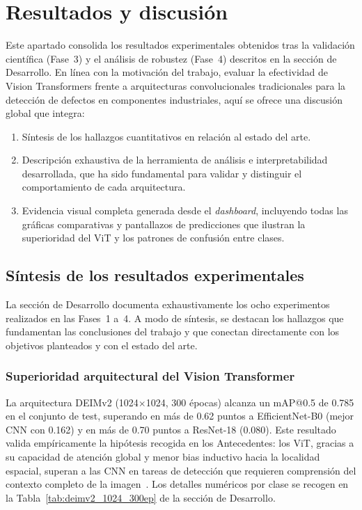\chapter{Resultados y discusión}
\label{ch:resultados}

Este apartado consolida los resultados experimentales obtenidos tras la validación científica (Fase~3) y el análisis de robustez (Fase~4) descritos en la sección de Desarrollo. En línea con la motivación del trabajo, evaluar la efectividad de Vision Transformers frente a arquitecturas convolucionales tradicionales para la detección de defectos en componentes industriales, aquí se ofrece una discusión global que integra:
\begin{enumerate}
    \item Síntesis de los hallazgos cuantitativos en relación al estado del arte.
    \item Descripción exhaustiva de la herramienta de análisis e interpretabilidad desarrollada, que ha sido fundamental para validar y distinguir el comportamiento de cada arquitectura.
    \item Evidencia visual completa generada desde el \textit{dashboard}, incluyendo todas las gráficas comparativas y pantallazos de predicciones que ilustran la superioridad del \acrshort{ViT} y los patrones de confusión entre clases.
\end{enumerate}


\section{Síntesis de los resultados experimentales}
\label{sec:sintesis_resultados}

La sección de Desarrollo documenta exhaustivamente los ocho experimentos realizados en las Fases~1 a~4. A modo de síntesis, se destacan los hallazgos que fundamentan las conclusiones del trabajo y que conectan directamente con los objetivos planteados y con el estado del arte.

\subsection{Superioridad arquitectural del Vision Transformer}

La arquitectura DEIMv2 (1024$\times$1024, 300 épocas) alcanza un mAP@0.5 de 0.785 en el conjunto de test, superando en más de 0.62 puntos a EfficientNet-B0 (mejor CNN con 0.162) y en más de 0.70 puntos a ResNet-18 (0.080). Este resultado valida empíricamente la hipótesis recogida en los Antecedentes: los \acrshort{ViT}, gracias a su capacidad de atención global y menor bias inductivo hacia la localidad espacial, superan a las \acrshort{CNN} en tareas de detección que requieren comprensión del contexto completo de la imagen~\cite{wang2022defect,sudarshan2025object}. Los detalles numéricos por clase se recogen en la Tabla~\ref{tab:deimv2_1024_300ep} de la sección de Desarrollo.

